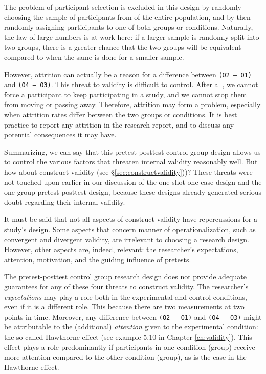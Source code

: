 \documentclass[
]{book}
\begin{document}
The problem of participant selection is excluded in this design by randomly choosing the sample of participants from of the entire population, and by then randomly assigning participants to one of both groups or conditions. Naturally, the law of large numbers is at work here: if a larger sample is randomly split into two groups, there is a greater chance that the two groups will be equivalent compared to when the same is done for a smaller sample.

However, attrition can actually be a reason for a difference between \texttt{(O2\ –\ O1)} and \texttt{(O4\ –\ O3)}. This threat to validity is difficult to control. After all, we cannot force a participant to keep participating in a study, and we cannot stop them from moving or passing away. Therefore, attrition may form a problem, especially when attrition rates differ between the two groups or conditions. It is best practice to report any attrition in the research report, and to discuss any potential consequences it may have.

Summarizing, we can say that this pretest-posttest control group design allows us to control the various factors that threaten internal validity reasonably well. But how about construct validity (see §\ref{sec:constructvalidity}))? These threats were not touched upon earlier in our discussion of the one-shot one-case design and the one-group pretest-posttest design, because these designs already generated serious doubt regarding their internal validity.

It must be said that not all aspects of construct validity have repercussions for a study's design. Some aspects that concern manner of operationalization, such as convergent and divergent validity, are irrelevant to choosing a research design. However, other aspects are, indeed, relevant: the researcher's expectations, attention, motivation, and the guiding influence of pretests.

The pretest-posttest control group research design does not provide adequate guarantees for any of these four threats to construct validity. The researcher's \emph{expectations} may play a role both in the experimental and control conditions, even if it is a different role. This because there are two measurements at two points in time. Moreover, any difference between \texttt{(O2\ –\ O1)} and \texttt{(O4\ –\ O3)} might be attributable to the (additional) \emph{attention} given to the experimental condition: the so-called Hawthorne effect (see example 5.10 in Chapter \ref{ch:validity}). This effect plays a role predominantly if participants in one condition (group) receive more attention compared to the other condition (group), as is the case in the Hawthorne effect.
\end{document}
